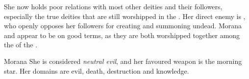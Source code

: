 She now holds poor relations with most other deities and their followers,
especially the true deities that are still worshipped in the . Her direct enemy is , who openly opposes her
followers for creating and summoning undead. Morana and 
appear to be on good terms, as they are both worshipped together among the
 of the .

\begin{35e}{Morana}
  She is considered \emph{neutral evil}, and her favoured weapon is the
  morning star. Her domains are evil, death, destruction and knowledge.
\end{35e}
